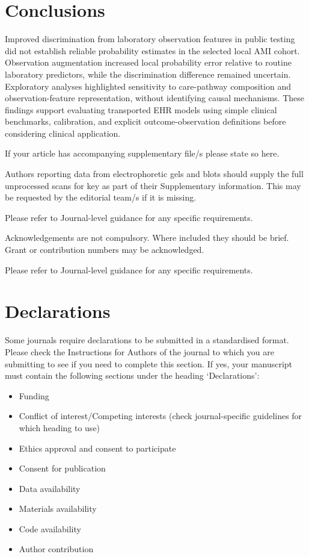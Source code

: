 \documentclass[pdflatex,sn-mathphys-num]{sn-jnl}%
\theoremstyle{thmstyleone}%
\theoremstyle{thmstyletwo}%
\theoremstyle{thmstylethree}%
\begin{document}
\section{Conclusions}

Improved discrimination from laboratory observation features in public testing did not establish reliable probability estimates in the selected local AMI cohort. Observation augmentation increased local probability error relative to routine laboratory predictors, while the discrimination difference remained uncertain. Exploratory analyses highlighted sensitivity to care-pathway composition and observation-feature representation, without identifying causal mechanisms. These findings support evaluating transported EHR models using simple clinical benchmarks, calibration, and explicit outcome-observation definitions before considering clinical application.



\backmatter


If your article has accompanying supplementary file/s please state so here. 

Authors reporting data from electrophoretic gels and blots should supply the full unprocessed scans for key as part of their Supplementary information. This may be requested by the editorial team/s if it is missing.

Please refer to Journal-level guidance for any specific requirements.


Acknowledgements are not compulsory. Where included they should be brief. Grant or contribution numbers may be acknowledged.

Please refer to Journal-level guidance for any specific requirements.

\section*{Declarations}

Some journals require declarations to be submitted in a standardised format. Please check the Instructions for Authors of the journal to which you are submitting to see if you need to complete this section. If yes, your manuscript must contain the following sections under the heading `Declarations':

\begin{itemize}
\item Funding
\item Conflict of interest/Competing interests (check journal-specific guidelines for which heading to use)
\item Ethics approval and consent to participate
\item Consent for publication
\item Data availability 
\item Materials availability
\item Code availability 
\item Author contribution
\end{itemize}
\end{document}
